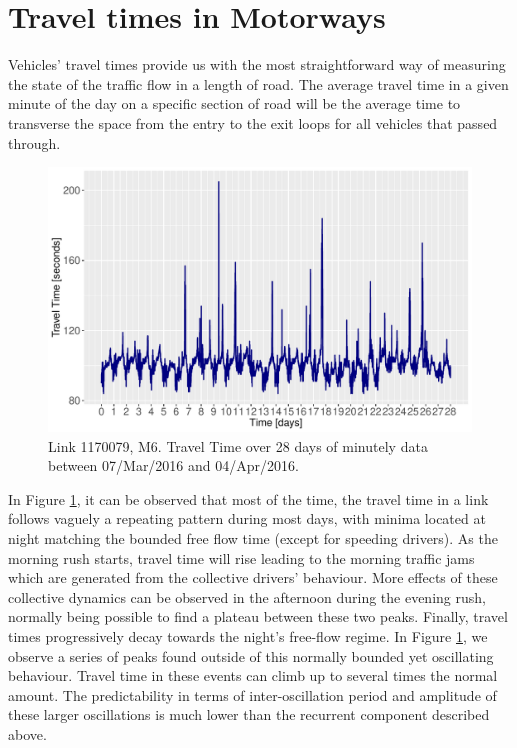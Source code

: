 \documentclass[a4paper, 10pt, conference]{ieeeconf}      %
\begin{document}
\section{Travel times in Motorways} \label{Travel times in Motorways}
Vehicles' travel times provide us with the most straightforward way of measuring the state of the traffic flow in a length of road.
The average travel time in a given minute of the day on a specific section of road will be the average time to transverse the space from the entry to the exit loops for all vehicles that passed through.
\begin{figure}[htbp]
\centerline{\includegraphics[width=\linewidth]{./images/Travel_Time.pdf}}
\caption{Link 1170079, M6. Travel Time over 28 days of minutely data between 07/Mar/2016 and 04/Apr/2016.}
\label{fig:travel_time}
\end{figure}
In Figure \ref{fig:travel_time}, it can be observed that most of the time, the travel time in a link follows vaguely a repeating pattern during most days, with minima located at night matching the bounded free flow time (except for speeding drivers).
As the morning rush starts, travel time will rise leading to the morning traffic jams which are generated from the collective drivers' behaviour.
More effects of these collective dynamics can be observed in the afternoon during the evening rush, normally being possible to find a plateau between these two peaks.
Finally, travel times progressively decay towards the night's free-flow regime.
In Figure \ref{fig:travel_time}, we observe a series of peaks found outside of this normally bounded yet oscillating behaviour. 
Travel time in these events can climb up to several times the normal amount.
The predictability in terms of inter-oscillation period and amplitude of these larger oscillations is much lower than the recurrent component described above.
\end{document}
